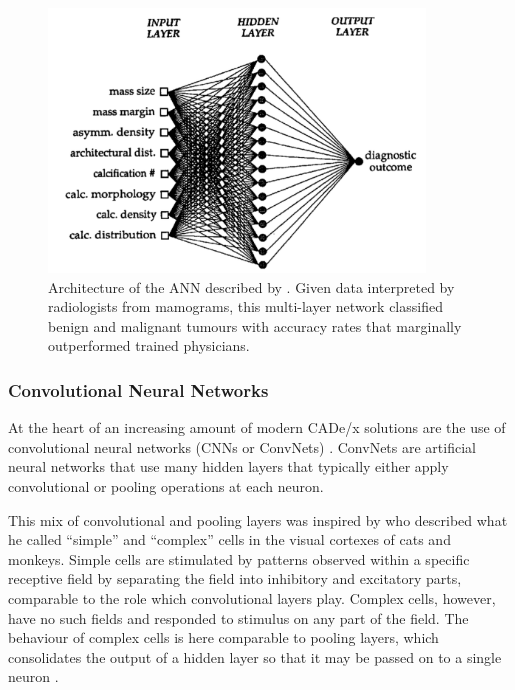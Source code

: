 \begin{figure}[ht!]
	\centering
	\includegraphics[width=100mm]{figures/intro/ann_brca.png}
	\caption{Architecture of the ANN described by \cite{floyd1994}. Given data interpreted by radiologists from mamograms, this multi-layer network classified benign and malignant tumours with accuracy rates that marginally outperformed trained physicians. \label{fig:ann_brca}}
\end{figure}

\subsubsection{Convolutional Neural Networks}

At the heart of an increasing amount of modern CADe/x solutions are the use of convolutional neural networks (CNNs or ConvNets) \citep{cheng2016}. ConvNets are artificial neural networks that use many hidden layers that typically either apply convolutional or pooling operations at each neuron.

This mix of convolutional and pooling layers was inspired by \citeauthor{hubel1968} who described what he called ``simple'' and ``complex'' cells in the visual cortexes of cats and monkeys. Simple cells are stimulated by patterns observed within a specific receptive field by separating the field into inhibitory and excitatory parts, comparable to the role which convolutional layers play. Complex cells, however, have no such fields and responded to stimulus on any part of the field. The behaviour of complex cells is here comparable to pooling layers, which consolidates the output of a hidden layer so that it may be passed on to a single neuron \citep{hubel1968, lecun2010}.

